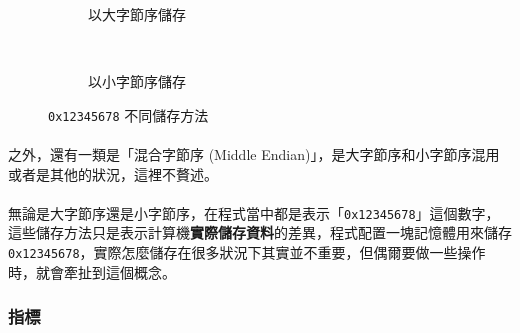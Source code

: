 \documentclass[12pt,a4paper,oneside]{article}
\begin{document}
\begin{CJK}{UTF8}{bkai}
\begin{figure}[h!]
\centering
\begin{subfigure}{0.4\textwidth}
  \centering
  \caption{以大字節序儲存}
  \label{program:struct:fig:big:endian}
\end{subfigure}
~
\begin{subfigure}{0.4\textwidth}
  \centering
  \caption{以小字節序儲存}
  \label{program:struct:fig:little:endian}
\end{subfigure}
\caption{\texttt{0x12345678} 不同儲存方法}
\label{program:struct:fig:big:little:endian}
\end{figure}

\paragraph{}之外，還有一類是「混合字節序 (Middle Endian)」，是大字節序和小字節序混用或者是其他的狀況，這裡不贅述。
\paragraph{}無論是大字節序還是小字節序，在程式當中都是表示「\texttt{0x12345678}」這個數字，這些儲存方法只是表示計算機\textbf{實際儲存資料}的差異，程式配置一塊記憶體用來儲存 \texttt{0x12345678}，實際怎麼儲存在很多狀況下其實並不重要，但偶爾要做一些操作時，就會牽扯到這個概念。

\subsubsection{指標}


\end{CJK}
\end{document}

